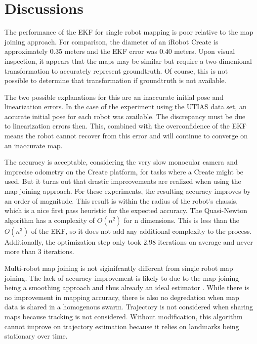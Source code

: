 \documentclass[12pt]{report}
\begin{document}
\chapter{Discussions}

	The performance of the EKF for single robot mapping is poor relative to the map joining approach.  For comparison, the diameter of an iRobot Create is approximately 0.35 meters and the EKF error was 0.40 meters.  Upon visual inspection, it appears that the maps may be similar but require a two-dimenional transformation to accurately represent groundtruth.  Of course, this is not possible to determine that transformation if groundtruth is not available.

	The two possible explanations for this are an inaccurate initial pose and linearization errors.  In the case of the experiment using the UTIAS data set, an accurate initial pose for each robot was available.  The discrepancy must be due to linearization errors then.  This, combined with the overconfidence of the EKF means the robot cannot recover from this error and will continue to converge on an inaccurate map.  

	The accuracy is acceptable, considering the very slow monocular camera and imprecise odometry on the Create platform, for tasks where a Create might be used.  But it turns out that drastic impreovements are realized when using the map joining approach.  For these experiments, the resulting accuracy improves by an order of magnitude.  This result is within the radius of the robot's chassis, which is a nice first pass heuristic for the expected accuracy.  The Quasi-Newton algorithm has a complexity of $O(n^2)$ \cite{matlab} for n dimensions.   This is less than the $O(n^3)$ of the EKF, so it does not add any additional complexity to the process.  Additionally, the optimization step only took 2.98 iterations on average and never more than 3 iterations.  

	Multi-robot map joining is not siginifcantly different from single robot map joining.  The lack of accuracy improvement is likely to due to the map joining being a smoothing approach and thus already an ideal estimator \cite{estimators}.  While there is no improvement in mapping accuracy, there is also no degredation when map data is shared in a homogenous swarm.  Trajectory is not considered when sharing maps because tracking is not considered.  Without modification, this algorithm cannot improve on trajectory estimation because it relies on landmarks being stationary over time.
\end{document}
